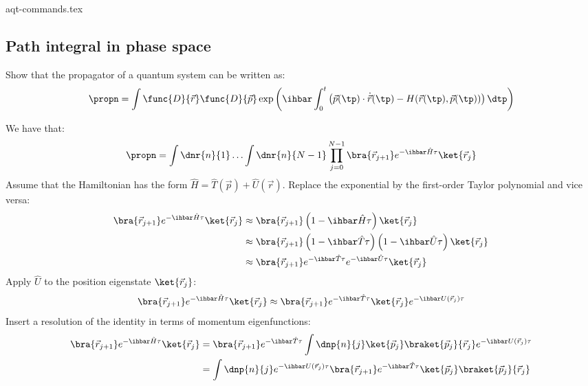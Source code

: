 {aqt-commands.tex}
\subsection{Path integral in phase space}

Show that the propagator of a quantum system can be written as:
\begin{equation}
  \label{result}
  \propn = \int\func{D}{\vec{r}}\func{D}{\vec{p}}\exp\left(
  \ihbar\int_{0}^{t}\left(
  \vec{p}(\tp) \cdot \dot{\vec{r}}(\tp) - H(\vec{r}(\tp), \vec{p}(\tp))
  \right)\dtp
  \right)
\end{equation}

We have that:
\begin{equation}
  \label{start}
  \propn = \int\dnr{n}{1}\ldots\int\dnr{n}{N - 1}
  \prod_{j = 0}^{N - 1} \bra{\vec{r}_{j + 1}} e^{-\ihbar \hat{H}\tau} \ket{\vec{r}_j}
\end{equation}
Assume that the Hamiltonian has the form $\hat{H} = \hat{T}(\vec{p}) +
  \hat{U}(\vec{r})$.
Replace the exponential by the first-order Taylor polynomial and vice versa:
\begin{align*}
  \bra{\vec{r}_{j + 1}}
  e^{-\ihbar\hat{H}\tau}
  \ket{\vec{r}_j}
   & \approx
  \bra{\vec{r}_{j + 1}}
  \left(1 - \ihbar\hat{H}\tau\right)
  \ket{\vec{r}_j}
  \\
   & \approx
  \bra{\vec{r}_{j + 1}}
  \left(1 - \ihbar\hat{T}\tau\right)
  \left(1 - \ihbar\hat{U}\tau\right)
  \ket{\vec{r}_j}
  \\
   & \approx
  \bra{\vec{r}_{j + 1}}
  e^{-\ihbar \hat{T}\tau} e^{-\ihbar \hat{U}\tau}
  \ket{\vec{r}_j}
\end{align*}
Apply $\hat{U}$ to the position eigenstate $\ket{\vec{r}_j}$:
\begin{equation*}
  \bra{\vec{r}_{j + 1}}
  e^{-\ihbar\hat{H}\tau}
  \ket{\vec{r}_j}
  \approx \bra{\vec{r}_{j + 1}}
  e^{-\ihbar \hat{T}\tau}
  \ket{\vec{r}_j}
  e^{-\ihbar U(\vec{r}_j)\tau}
\end{equation*}
Insert a resolution of the identity in terms of momentum eigenfunctions:
\begin{align*}
  \bra{\vec{r}_{j + 1}}
  e^{-\ihbar \hat{H}\tau}
  \ket{\vec{r}_j}
   & =
  \bra{\vec{r}_{j + 1}}
  e^{-\ihbar \hat{T}\tau}
  \int\dnp{n}{j}
  \ket{\vec{p}_j}
  \braket{\vec{p}_j}{\vec{r}_j}
  e^{-\ihbar U(\vec{r}_j)\tau}
  \\
   & =
  \int\dnp{n}{j}
  e^{-\ihbar U(\vec{r}_j)\tau}
  \bra{\vec{r}_{j + 1}}
  e^{-\ihbar \hat{T}\tau}
  \ket{\vec{p}_j}
  \braket{\vec{p}_j}{\vec{r}_j}
\end{align*}
